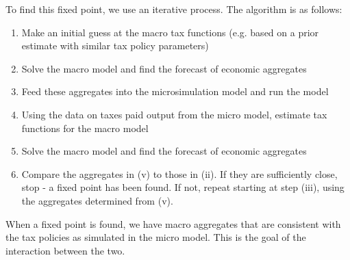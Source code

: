\documentclass[letterpaper,11pt]{article}
\theoremstyle{definition}
\begin{document}
To find this fixed point, we use an iterative process.  The algorithm is as follows:
\begin{enumerate}
\item Make an initial guess at the macro tax functions (e.g. based on a prior estimate with similar tax policy parameters)
\item Solve the macro model and find the forecast of economic aggregates
\item Feed these aggregates into the microsimulation model and run the model
\item Using the data on taxes paid output from the micro model, estimate tax functions for the macro model
\item Solve the macro model and find the forecast of economic aggregates
\item Compare the aggregates in (v) to those in (ii).  If they are sufficiently close, stop - a fixed point has been found.  If not, repeat starting at step (iii), using the aggregates determined from (v).
\end{enumerate}

When a fixed point is found, we have macro aggregates that are consistent with the tax policies as simulated in the micro model.  This is the goal of the interaction between the two.
\end{document}

